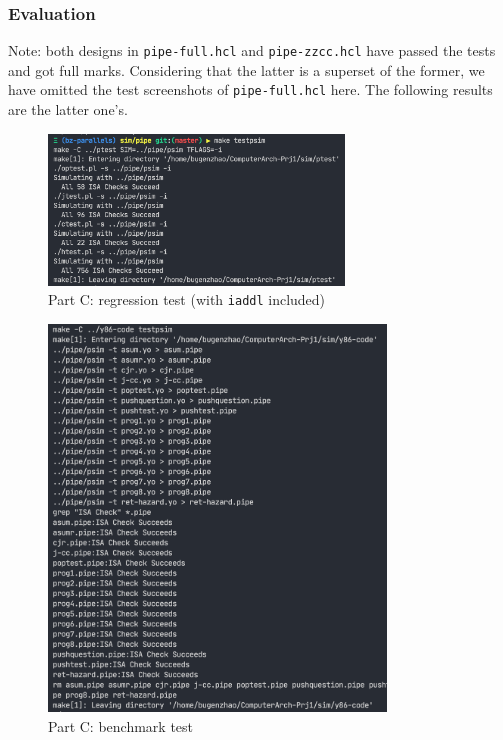 \documentclass[12pt,a4paper]{article}
\begin{document}
\subsubsection{Evaluation}
Note: both designs in \texttt{pipe-full.hcl} and \texttt{pipe-zzcc.hcl} have passed the tests and got full marks. Considering that the latter is a superset of the former, we have omitted the test screenshots of \texttt{pipe-full.hcl} here. The following results are the latter one's.
\begin{figure}[H] %
        \centering %
        \includegraphics[width=0.7\textwidth]{partC-regression-test.png} %
        \caption{Part C: regression test (with \texttt{iaddl} included)} %
        \label{Fig.partC-regression} %
\end{figure}
\begin{figure}[H] %
        \centering %
        \includegraphics[width=0.8\textwidth]{partC-test2.png} %
        \caption{Part C: benchmark test} %
        \label{Fig.partC-benchmark} %
\end{figure}
\end{document}
